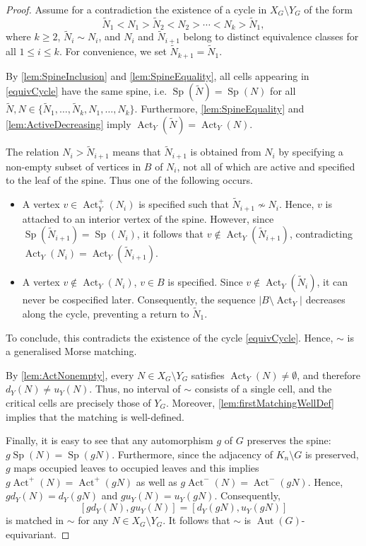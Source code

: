 \documentclass[reqno,dvipsnames]{amsart}
\theoremstyle{plain}
\numberwithin{equation}{section}
\theoremstyle{definition}
\DeclareMathOperator{\Act}{Act}
\DeclareMathOperator{\Sp}{Sp}
\DeclareMathOperator{\Aut}{Aut}
\begin{document}
\begin{proof}
	Assume for a contradiction the existence of a cycle in $X_G\setminus Y_G$ of the form
	\begin{equation} \label{equivCycle}
		\tilde{N}_1 < N_1 > \tilde{N}_2 < N_2 > \cdots < N_k > \tilde{N}_1,
	\end{equation}
	where $k\geq 2$, $\tilde{N}_i \sim N_i$, and $N_i$ and $\tilde{N}_{i+1}$ belong to distinct equivalence classes for all $1\leq i\leq k$. For convenience, we set $\tilde{N}_{k+1}=\tilde{N}_1$.
	
	By \autoref{lem:SpineInclusion} and \autoref{lem:SpineEquality}, all cells appearing in \eqref{equivCycle} have the same spine, i.e. $\Sp(\tilde{N}) = \Sp(N)$ for all $\tilde{N},N\in\{\tilde{N}_1,\dots,\tilde{N}_k,N_1,\dots,N_k\}$. Furthermore, \autoref{lem:SpineEquality} and \autoref{lem:ActiveDecreasing} imply $\Act_Y(\tilde{N}) = \Act_Y(N)$.
	
	The relation $N_i>\tilde{N}_{i+1}$ means that $\tilde{N}_{i+1}$ is obtained from $N_i$ by specifying a non-empty subset of vertices in $B$ of $N_i$, not all of which are active and specified to the leaf of the spine. Thus one of the following occurs.
	\begin{itemize}
		\item[(a)] A vertex $v\in\Act_Y^+(N_i)$ is specified such that $\tilde{N}_{i+1} \not\sim N_i$. Hence, $v$ is attached to an interior vertex of the spine. However, since $\Sp(\tilde{N}_{i+1})=\Sp(N_i)$, it follows that $v\notin \Act_Y(\tilde{N}_{i+1})$, contradicting $\Act_Y(N_i) = \Act_Y(\tilde{N}_{i+1})$.
		\item[(b)] A vertex $v\notin \Act_Y(N_i)$, $v\in B$ is specified. Since $v\notin \Act_Y(\tilde{N}_i)$, it can never be cospecified later. Consequently, the sequence $\vert B\setminus \Act_Y\vert$ decreases along the cycle, preventing a return to $\tilde{N}_1$.
	\end{itemize}
	To conclude, this contradicts the existence of the cycle \eqref{equivCycle}. Hence, $\sim$ is a generalised Morse matching.
	
	By \autoref{lem:ActNonempty}, every $N\in X_G\setminus Y_G$ satisfies $\Act_Y(N)\neq \emptyset$, and therefore $d_Y(N)\neq u_Y(N)$. Thus, no interval of $\sim$ consists of a single cell, and the critical cells are precisely those of $Y_G$. Moreover, \autoref{lem:firstMatchingWellDef} implies that the matching is well-defined.
	
	Finally, it is easy to see that any automorphism $g$ of $G$ preserves the spine: $g\Sp(N)=\Sp(gN)$. Furthermore, since the adjacency of $K_n\setminus G$ is preserved, $g$ maps occupied leaves to occupied leaves and this implies $g\Act^+(N)=\Act^+(gN)$ as well as $g\Act^-(N)=\Act^-(gN)$. Hence, $gd_Y(N) = d_Y(gN)$ and $gu_Y(N) = u_Y(gN)$. Consequently,
	\[
	[gd_Y(N), gu_Y(N)] = [d_Y(gN), u_Y(gN)]
	\] 
	is matched in $\sim$ for any $N\in X_G\setminus Y_G$. It follows that $\sim$ is $\Aut(G)$-equivariant.
\end{proof}
\end{document}
